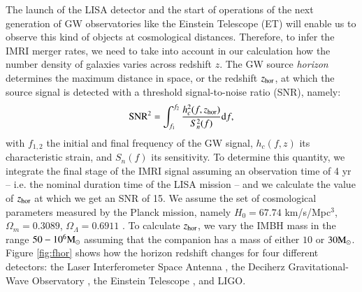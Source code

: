 \documentclass[article]{aa}
\newcommand{\Ms}{{\rm M}_\odot}
\begin{document}
The launch of the LISA detector and the start of operations of the next generation of GW observatories like the Einstein Telescope (ET) will enable us to observe this kind of objects at cosmological distances. Therefore, to infer the IMRI merger rates, we need to take into account in our calculation how the number density of galaxies varies across redshift $z$.
The GW source {\it horizon} determines the maximum distance in space, or the redshift $z_{\rm hor}$, at which the source signal is detected with a threshold signal-to-noise ratio (SNR), namely:
\begin{equation}
{\rm SNR^2} = \int_{f_1}^{f_2} \displaystyle{\frac{h_c^2(f,z_{\rm hor})}{S_n^2(f)}} {\rm d}f,
\end{equation}
with $f_{1,2}$ the initial and final frequency of the GW signal, $h_c(f,z)$ its characteristic strain, and $S_n(f)$ its sensitivity. To determine this quantity, we integrate the final stage of the IMRI signal assuming an observation time of 4 yr -- i.e. the nominal duration time of the LISA mission -- and we calculate the value of $z_{\rm hor}$ at which we get an SNR of 15. We assume the set of cosmological parameters measured by the Planck mission, namely $H_0 = 67.74$ km/s/Mpc$^{3}$, $\Omega_m = 0.3089$, $\Omega_\Lambda = 0.6911$ \citep{planck15}. To calculate $z_{\rm hor}$, we vary the IMBH mass in the range $50-10^6\Ms$ assuming that the companion has a mass of either $10$ or $30\Ms$. Figure \ref{fig:fhor} shows how the horizon redshift changes for four different detectors: the Laser Interferometer Space Antenna \citep[LISA\footnote{\url{https://www.elisascience.org/}},][]{amaro12}, the Deciherz Gravitational-Wave Observatory \citep[DECIGO\footnote{\url{http://tamago.mtk.nao.ac.jp/spacetime/decigo_e.html}},][]{seto01}, the Einstein Telescope \citep[ET\footnote{\url{http://www.et-gw.eu/}},][]{punturo10}, and LIGO. 
\end{document}
